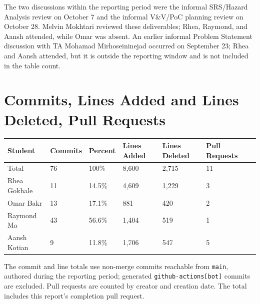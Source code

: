 \documentclass{article}
\begin{document}
The two discussions within the reporting period were the informal SRS/Hazard
Analysis review on October 7 and the informal V\&V/PoC planning review on
October 28.  Melvin Mokhtari reviewed these deliverables; Rhea, Raymond, and
Aansh attended, while Omar was absent.  An earlier informal Problem Statement
discussion with TA Mohamad Mirhoseininejad occurred on September 23; Rhea and
Aansh attended, but it is outside the reporting window and is not included in
the table count.

\section{Commits, Lines Added and Lines Deleted, Pull Requests}

\begin{table}[H]
\centering
\begin{tabular}{lllllll}
\toprule
\textbf{Student} & \textbf{Commits} & \textbf{Percent} & \textbf{Lines Added} &
\textbf{Lines Deleted} & \textbf{Pull Requests}\\
\midrule
Total & 76 & 100\% & 8,600 & 2,715 & 11\\
Rhea Gokhale & 11 & 14.5\% & 4,609 & 1,229 & 3\\
Omar Bakr & 13 & 17.1\% & 881 & 420 & 2\\
Raymond Ma & 43 & 56.6\% & 1,404 & 519 & 1\\
Aansh Kotian & 9 & 11.8\% & 1,706 & 547 & 5\\
\bottomrule
\end{tabular}
\end{table}

The commit and line totals use non-merge commits reachable from
\texttt{main}, authored during the reporting period; generated
\texttt{github-actions[bot]} commits are excluded.  Pull requests are counted
by creator and creation date.  The total includes this report's completion pull
request.
\end{document}
